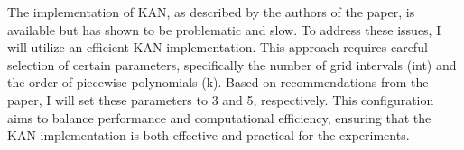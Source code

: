 The implementation of KAN, as described by the authors of the paper, is available but has shown to be problematic and slow. To address these issues, I will utilize an efficient KAN implementation. This approach requires careful selection of certain parameters, specifically the number of grid intervals (int) and the order of piecewise polynomials (k). Based on recommendations from the paper, I will set these parameters to 3 and 5, respectively. This configuration aims to balance performance and computational efficiency, ensuring that the KAN implementation is both effective and practical for the experiments.